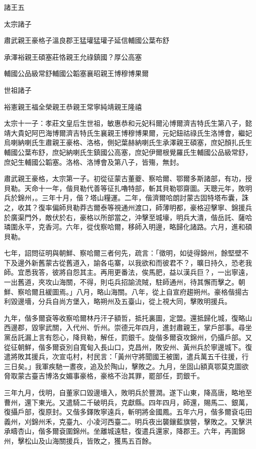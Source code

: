 
\begin{pinyinscope}
諸王五

太宗諸子

肅武親王豪格子溫良郡王猛瓘猛瓘子延信輔國公葉布舒

承澤裕親王碩塞莊恪親王允祿鎮國？厚公高塞

輔國公品級常舒輔國公韜塞襄昭親王博穆博果爾

世祖諸子

裕憲親王福全榮親王恭親王常寧純靖親王隆禧

太宗十一子：孝莊文皇后生世祖，敏惠恭和元妃科爾沁博爾濟吉特氏生第八子，懿靖大貴妃阿巴海博爾濟吉特氏生襄親王博穆博果爾，元妃鈕祜祿氏生洛博會，繼妃烏喇納喇氏生肅親王豪格、洛格，側妃葉赫納喇氏生承澤親王碩塞，庶妃顏扎氏生輔國公葉布舒，庶妃納喇氏生鎮國公高塞，庶妃伊爾根覺羅氏生輔國公品級常舒，庶妃生輔國公韜塞。洛格、洛博會及第八子，皆殤，無封。

肅武親王豪格，太宗第一子。初從征蒙古董夔、察哈爾、鄂爾多斯諸部，有功，授貝勒。天命十一年，偕貝勒代善等征扎嚕特部，斬其貝勒鄂齋圖。天聰元年，敗明兵於錦州，。三年十月，偕？塔山糧運。二年，偕濟爾哈朗討蒙古固特塔布囊，誅之，收其？復率偏師貝勒莽古爾泰等視通州渡口，師薄明都，豪格迎擊寧、錦援兵於廣渠門外，敵伏於右，豪格以所部當之，沖擊至城壕，明兵大潰，偕岳託、薩哈璘圍永平，克香河。六年，從伐察哈爾，移師入明邊，略歸化諸路。六月，進和碩貝勒。

七年，詔問征明與朝鮮、察哈爾三者何先，疏言：「徵明，如徒得錦州，餘堅壁不下及邊外新舊蒙古從舊道入，諭各屯寨，以我欲和而彼君不？，曠日持久，恐老我師。宜悉我答，彼將自怨其主。再用更番法，俟馬肥，益以漢兵巨？，一出寧遠，一出舊道，夾攻山海關，不得，則屯兵招諭流賊，駐師通州，待其懈而擊之。朝鮮、察哈爾且緩圖焉。」八月，略山海關。八年，從上自宣府趨朔州。豪格偕揚古利毀邊墻，分兵自尚方堡入，略朔州及五臺山，從上視大同，擊敗明援兵。

九年，偕多爾袞等收察哈爾林丹汗子額哲，抵托裏圖，定盟。還抵歸化城，復略山西邊郡，毀寧武關，入代州、忻州。崇德元年四月，進封肅親王，掌戶部事。尋坐黨岳託漏上言有怨心，降貝勒，解任，罰銀千。旋偕多爾袞攻錦州，仍攝戶部。又從征朝鮮，偕多爾袞別自寬甸入長山口，克昌州，敗安州、黃州兵於寧邊城下。復遣將敗其援兵，次宣屯村，村民言：「黃州守將聞國王被圍，遣兵萬五千往援，行三日矣。」我軍疾馳一晝夜，追及於陶山，擊敗之。九月，坐固山額真鄂莫克圖欲脅取蒙古臺吉博洛女媚事豪格，豪格不治其罪，罷部任，罰銀千。

三年九月，伐明，自董家口毀邊墻入，敗明兵於豐潤。遂下山東，降高唐，略地至曹州，還下東光。又遣騎二千破明兵，克獻縣。四年四月，師還，賜馬二、銀萬，復攝戶部，復原封。又偕多鐸敗寧遠兵，斬明將金國鳳。五年六月，偕多爾袞屯田義州，刈錦州禾，克臺九、小凌河西臺二。明兵夜出襲鑲藍旗營，擊敗之。又擊洪承疇杏山，偕多爾袞圍錦州。坐離城遠駐，復遣兵還家，降郡王。六年，再圍錦州，擊松山及山海關援兵，皆敗之，獲馬五百餘。


\end{pinyinscope}

